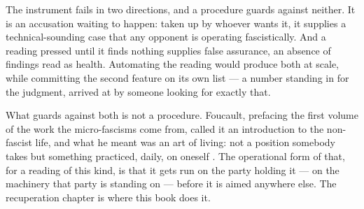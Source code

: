 The instrument fails in two directions, and a procedure guards against neither. It is an accusation waiting to happen: taken up by whoever wants it, it supplies a technical-sounding case that any opponent is operating fascistically. And a reading pressed until it finds nothing supplies false assurance, an absence of findings read as health. Automating the reading would produce both at scale, while committing the second feature on its own list — a number standing in for the judgment, arrived at by someone looking for exactly that.

What guards against both is not a procedure. Foucault, prefacing the first volume of the work the micro-fascisms come from, called it an introduction to the non-fascist life, and what he meant was an art of living: not a position somebody takes but something practiced, daily, on oneself \autocite{foucault1977preface}. The operational form of that, for a reading of this kind, is that it gets run on the party holding it — on the machinery that party is standing on — before it is aimed anywhere else. The recuperation chapter is where this book does it.
